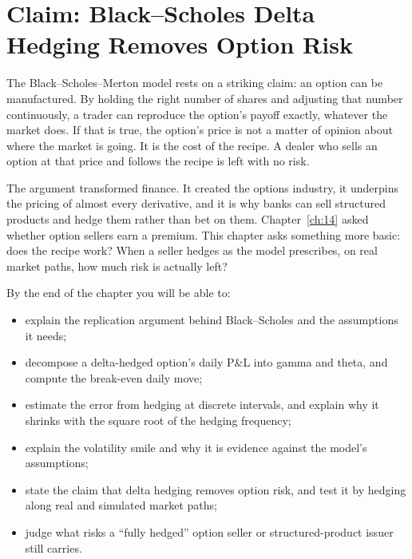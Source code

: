 \makeatletter
{}
\makeatother

\chapter{Claim: Black--Scholes Delta Hedging Removes Option Risk}
\label{ch:15}

The Black--Scholes--Merton model rests on a striking claim: an option can be manufactured. By holding the right number of shares and adjusting that number continuously, a trader can reproduce the option's payoff exactly, whatever the market does. If that is true, the option's price is not a matter of opinion about where the market is going. It is the cost of the recipe. A dealer who sells an option at that price and follows the recipe is left with no risk.

The argument transformed finance. It created the options industry, it underpins the pricing of almost every derivative, and it is why banks can sell structured products and hedge them rather than bet on them. Chapter~\ref{ch:14} asked whether option sellers earn a premium. This chapter asks something more basic: does the recipe work? When a seller hedges as the model prescribes, on real market paths, how much risk is actually left?

By the end of the chapter you will be able to:

\begin{itemize}
  \item explain the replication argument behind Black--Scholes and the assumptions it needs;
  \item decompose a delta-hedged option's daily P\&L into gamma and theta, and compute the break-even daily move;
  \item estimate the error from hedging at discrete intervals, and explain why it shrinks with the square root of the hedging frequency;
  \item explain the volatility smile and why it is evidence against the model's assumptions;
  \item state the claim that delta hedging removes option risk, and test it by hedging along real and simulated market paths;
  \item judge what risks a ``fully hedged'' option seller or structured-product issuer still carries.
\end{itemize}


